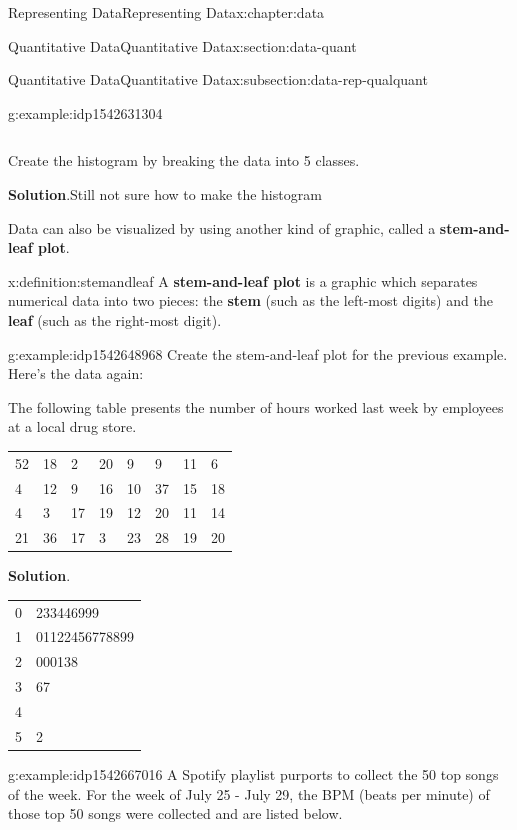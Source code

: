 \documentclass[oneside,10pt,]{book}
\newcommand{\blocktitlefont}{\relax}
\newcommand{\tabularfont}{\relax}
\newcommand{\terminology}[1]{\textbf{#1}}
\begin{document}
\begin{chapterptx}{Representing Data}{}{Representing Data}{}{}{x:chapter:data}
\begin{sectionptx}{Quantitative Data}{}{Quantitative Data}{}{}{x:section:data-quant}
\begin{subsectionptx}{Quantitative Data}{}{Quantitative Data}{}{}{x:subsection:data-rep-qualquant}
\begin{example}{}{g:example:idp1542631304}
\begin{center}
{\begin{tabular}{llllllll}
\end{tabular}
}%
\end{center}%
%
\par
Create the histogram by breaking the data into 5 classes.%
\par\smallskip%
\noindent\textbf{\blocktitlefont Solution}.\hypertarget{g:solution:idp1542647304}{}\quad{}Still not sure how to make the histogram%
\end{example}
Data can also be visualized by using another kind of graphic, called a \terminology{stem-and-leaf plot}.%
\begin{definition}{}{x:definition:stemandleaf}%
A \terminology{stem-and-leaf plot} is a graphic which separates numerical data into two pieces: the \terminology{stem} (such as the left-most digits) and the \terminology{leaf} (such as the right-most digit).%
\end{definition}
\begin{example}{}{g:example:idp1542648968}%
Create the stem-and-leaf plot for the previous example.  Here's the data again:%
\par
The following table presents the number of hours worked last week by employees at a local drug store. \begin{center}%
{\tabularfont%
\begin{tabular}{llllllll}
52&18&2&20&9&9&11&6\tabularnewline[0pt]
4&12&9&16&10&37&15&18\tabularnewline[0pt]
4&3&17&19&12&20&11&14\tabularnewline[0pt]
21&36&17&3&23&28&19&20
\end{tabular}
}%
\end{center}%
%
\par\smallskip%
\noindent\textbf{\blocktitlefont Solution}.\hypertarget{g:solution:idp1542659848}{}\quad{}\begin{center}%
{\tabularfont%
\begin{tabular}{ll}
0&233446999\tabularnewline[0pt]
1&01122456778899\tabularnewline[0pt]
2&000138\tabularnewline[0pt]
3&67\tabularnewline[0pt]
4\tabularnewline[0pt]
5&2
\end{tabular}
}%
\end{center}%
\end{example}
\begin{example}{}{g:example:idp1542667016}%
A Spotify playlist purports to collect the 50 top songs of the week.  For the week of July 25 - July 29, the BPM (beats per minute) of those top 50 songs were collected and are listed below.%
\par
\begin{center}%
{\tabularfont%
}
\end{center}
\end{example}
\end{subsectionptx}
\end{sectionptx}
\end{chapterptx}
\end{document}
